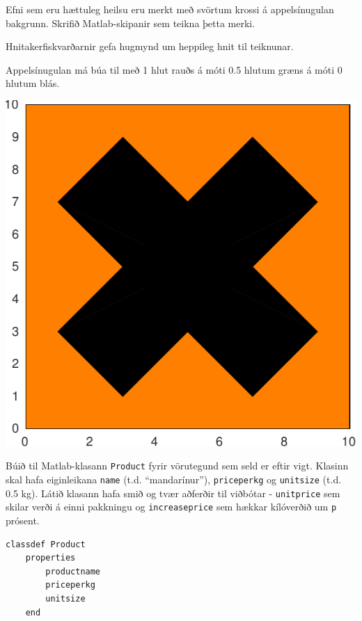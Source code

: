 \documentclass[addpoints]{exam}
\begin{document}
\begin{questions}
\newpage

\question[10]

\begin{multicols}{2}
Efni sem eru hættuleg heilsu eru merkt með svörtum krossi á appelsínugulan bakgrunn. Skrifið Matlab-skipanir sem teikna þetta merki.

Hnitakerfiskvarðarnir gefa hugmynd um heppileg hnit til teiknunar.

Appelsínugulan má búa til með 1 hlut rauðs á móti 0.5 hlutum græns á móti 0 hlutum blás.

\begin{center}
    \includegraphics[width=0.8\linewidth]{Pics/haettulegtheilsu}
\end{center}

\end{multicols}

\newpage

\question[10] Búið til Matlab-klasann \texttt{Product} fyrir vörutegund sem seld er eftir vigt. Klasinn skal hafa eiginleikana \texttt{name} (t.d. ``mandarínur''), \texttt{priceperkg} og \texttt{unitsize} (t.d. 0.5 kg). Látið klasann hafa smið og tvær aðferðir til viðbótar - \texttt{unitprice} sem skilar verði á einni pakkningu og \texttt{increaseprice} sem hækkar kílóverðið um \texttt{p} prósent.

\begin{solution}
    
\begin{verbatim}
classdef Product
    properties
        productname
        priceperkg
        unitsize
    end
    

\end{verbatim}
\end{solution}
\end{questions}
\end{document}
